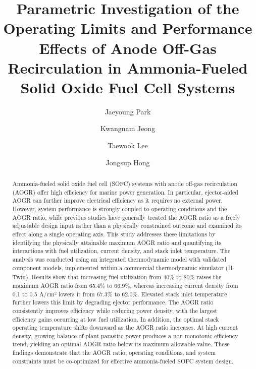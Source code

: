 \documentclass[a4paper,10pt]{cas-dc} %
\begin{document}
\shorttitle{}

\title{Parametric Investigation of the Operating Limits and Performance Effects of Anode Off-Gas Recirculation in Ammonia-Fueled Solid Oxide Fuel Cell Systems}

\author[yonsei]{Jaeyoung Park}
\author[yonsei]{Kwangnam Jeong}
\author[yonsei]{Taewook Lee}
\author[yonsei]{Jongsup Hong}
\cormark[1]


\begin{abstract}
Ammonia-fueled solid oxide fuel cell (SOFC) systems with anode off-gas recirculation (AOGR) offer high efficiency for marine power generation.
In particular, ejector-aided AOGR can further improve electrical efficiency as it requires no external power.
However, system performance is strongly coupled to operating conditions and the AOGR ratio, while previous studies have generally treated the AOGR ratio as a freely adjustable design input rather than a physically constrained outcome and examined its effect along a single operating axis.
This study addresses these limitations by identifying the physically attainable maximum AOGR ratio and quantifying its interactions with fuel utilization, current density, and stack inlet temperature.
The analysis was conducted using an integrated thermodynamic model with validated component models, implemented within a commercial thermodynamic simulator (H-Twin\textsuperscript{\textregistered}).
Results show that increasing fuel utilization from 40\% to 80\% raises the maximum AOGR ratio from 65.4\% to 66.9\%, whereas increasing current density from 0.1 to 0.5 A/cm² lowers it from 67.3\% to 62.0\%.
Elevated stack inlet temperature further lowers this limit by degrading ejector performance.
The AOGR ratio consistently improves efficiency while reducing power density, with the largest efficiency gains occurring at low fuel utilization.
In addition, the optimal stack operating temperature shifts downward as the AOGR ratio increases.
At high current density, growing balance-of-plant parasitic power produces a non-monotonic efficiency trend, yielding an optimal AOGR ratio below its maximum allowable value.
These findings demonstrate that the AOGR ratio, operating conditions, and system constraints must be co-optimized for effective ammonia-fueled SOFC system design.
\end{abstract}
\end{document}
